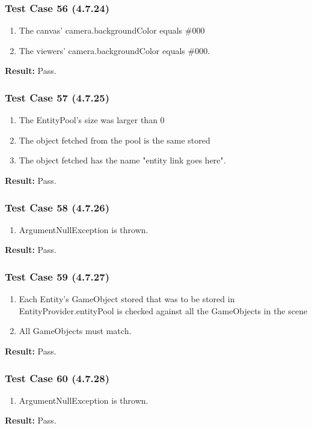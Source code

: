 \documentclass[a4paper,12pt]{article}
\begin{document}
		\subsubsection{Test Case 56 (4.7.24)}
				\begin{enumerate}
					\item The canvas' camera.backgroundColor equals \#000
					\item The viewers' camera.backgroundColor equals \#000.
				\end{enumerate}
			\textbf{Result: }Pass.
		\subsubsection{Test Case 57 (4.7.25)}
				\begin{enumerate}
					\item The EntityPool’s size was larger than 0
					\item The object fetched from the pool is the same stored
					\item  The object fetched has the name "entity link goes here".
				\end{enumerate}
			\textbf{Result: }Pass.
		\subsubsection{Test Case 58 (4.7.26)}
				\begin{enumerate}
					\item ArgumentNullException is thrown.
				\end{enumerate}
			\textbf{Result: }Pass.
		\subsubsection{Test Case 59 (4.7.27)}
				\begin{enumerate}
					\item Each Entity’s GameObject stored that was to be stored in EntityProvider.entityPool is checked against all the GameObjects in the scene
					\item All GameObjects must match.
				\end{enumerate}
			\textbf{Result: }Pass.
		\subsubsection{Test Case 60 (4.7.28)}
				\begin{enumerate}
					\item ArgumentNullException is thrown.
				\end{enumerate}
			\textbf{Result: }Pass.
\end{document}

